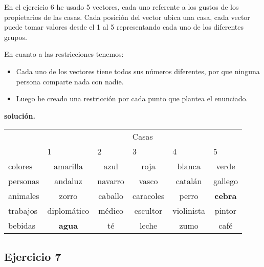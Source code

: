 \documentclass[a4paper,11pt]{article}
\begin{document}
En el ejercicio 6 he usado 5 vectores, cada uno referente a los gustos de los propietarios de las casas. Cada posición del vector ubica una casa, cada vector puede tomar valores desde el 1 al 5 representando cada uno de los diferentes grupos.

En cuanto a las restricciones tenemos:

\begin{itemize}
\item Cada uno de los vectores tiene todos sus números diferentes, por que ninguna persona comparte nada con nadie.
\item Luego he creado una restricción por cada punto que plantea el enunciado.
\end{itemize}

\textbf{solución.}
\begin{table}[h]
\begin{tabular}{l|c|c|c|c|c|}
\cline{2-6}
                               & \multicolumn{5}{c|}{Casas}                                                                                                 \\ \cline{2-6} 
                               & \multicolumn{1}{l|}{1} & \multicolumn{1}{l|}{2} & \multicolumn{1}{l|}{3} & \multicolumn{1}{l|}{4} & \multicolumn{1}{l|}{5} \\ \hline
\multicolumn{1}{|l|}{colores}  & amarilla               & azul                   & roja                   & blanca                 & verde                  \\ \hline
\multicolumn{1}{|l|}{personas} & andaluz                & navarro                & vasco                  & catalán                & gallego                \\ \hline
\multicolumn{1}{|l|}{animales} & zorro                  & caballo                & caracoles              & perro                  & \textbf{cebra}         \\ \hline
\multicolumn{1}{|l|}{trabajos} & diplomático            & médico                 & escultor               & violinista             & pintor                 \\ \hline
\multicolumn{1}{|l|}{bebidas}  & \textbf{agua}          & té                     & leche                  & zumo                   & café                   \\ \hline
\end{tabular}
\end{table}

\subsection{Ejercicio 7}
\end{document}
